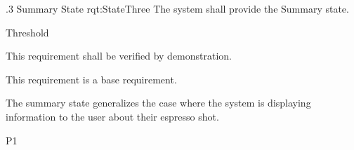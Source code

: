 \ONERQMTV
{\RqtNumberBase.3}
{Summary State}
{rqt:StateThree}
{The system shall provide the Summary state.}
{
	\item [Phase 1] Threshold
}
{This requirement shall be verified by demonstration.}
{
	\item [N/A] This requirement is a base requirement.
}
{
	\item The summary state generalizes the case where the system is displaying information to the user about their espresso shot.
}
{P1}
